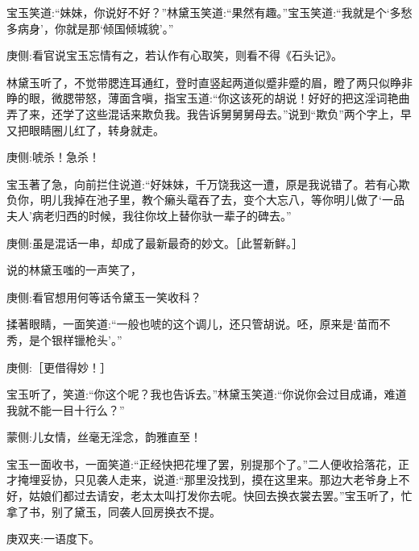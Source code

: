 \begin{parag}
    宝玉笑道:“妹妹，你说好不好？”林黛玉笑道:“果然有趣。”宝玉笑道:“我就是个‘多愁多病身’，你就是那‘倾国倾城貌’。”\begin{note}庚侧:看官说宝玉忘情有之，若认作有心取笑，则看不得《石头记》。\end{note}林黛玉听了，不觉带腮连耳通红，登时直竖起两道似蹙非蹙的眉，瞪了两只似睁非睁的眼，微腮带怒，薄面含嗔，指宝玉道:“你这该死的胡说！好好的把这淫词艳曲弄了来，还学了这些混话来欺负我。我告诉舅舅舅母去。”说到“欺负”两个字上，早又把眼睛圈儿红了，转身就走。\begin{note}庚侧:唬杀！急杀！\end{note}宝玉著了急，向前拦住说道:“好妹妹，千万饶我这一遭，原是我说错了。若有心欺负你，明儿我掉在池子里，教个癞头鼋吞了去，变个大忘八，等你明儿做了‘一品夫人’病老归西的时候，我往你坟上替你驮一辈子的碑去。”\begin{note}庚侧:虽是混话一串，却成了最新最奇的妙文。［此誓新鲜。］\end{note}说的林黛玉嗤的一声笑了，\begin{note}庚侧:看官想用何等话令黛玉一笑收科？\end{note}揉著眼睛，一面笑道:“一般也唬的这个调儿，还只管胡说。呸，原来是‘苗而不秀，是个银样镴枪头’。”\begin{note}庚侧:［更借得妙！］\end{note}宝玉听了，笑道:“你这个呢？我也告诉去。”林黛玉笑道:“你说你会过目成诵，难道我就不能一目十行么？”\begin{note}蒙侧:儿女情，丝毫无淫念，韵雅直至！\end{note}
\end{parag}


\begin{parag}
    宝玉一面收书，一面笑道:“正经快把花埋了罢，别提那个了。”二人便收拾落花，正才掩埋妥协，只见袭人走来，说道:“那里没找到，摸在这里来。那边大老爷身上不好，姑娘们都过去请安，老太太叫打发你去呢。快回去换衣裳去罢。”宝玉听了，忙拿了书，别了黛玉，同袭人回房换衣不提。\begin{note}庚双夹:一语度下。\end{note}
\end{parag}


